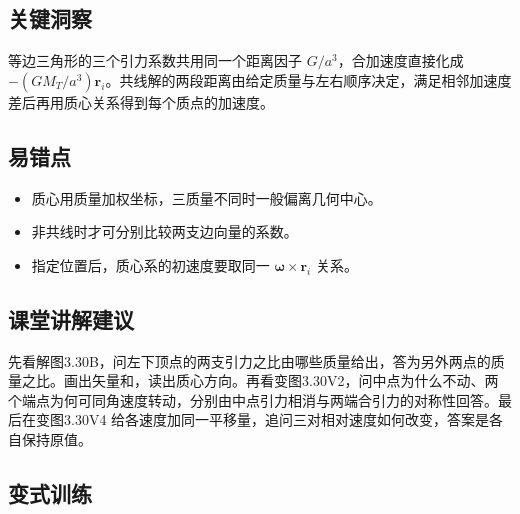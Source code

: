 \documentclass[UTF8,fontset=fandol,a4paper,11pt]{ctexart}
\newcommand{\vect}[1]{\bm{#1}}
\begin{document}


\subsection*{关键洞察}

等边三角形的三个引力系数共用同一个距离因子 $G/a^3$，合加速度直接化成 $-(GM_T/a^3)\vect r_i$。共线解的两段距离由给定质量与左右顺序决定，满足相邻加速度差后再用质心关系得到每个质点的加速度。



\subsection*{易错点}

\begin{itemize}
\item 质心用质量加权坐标，三质量不同时一般偏离几何中心。
\item 非共线时才可分别比较两支边向量的系数。
\item 指定位置后，质心系的初速度要取同一 $\vect\omega\times\vect r_i$ 关系。
\end{itemize}



\subsection*{课堂讲解建议}

先看解图3.30B，问左下顶点的两支引力之比由哪些质量给出，答为另外两点的质量之比。画出矢量和，读出质心方向。再看变图3.30V2，问中点为什么不动、两个端点为何可同角速度转动，分别由中点引力相消与两端合引力的对称性回答。最后在变图3.30V4 给各速度加同一平移量，追问三对相对速度如何改变，答案是各自保持原值。



\subsection*{变式训练}
\end{document}
